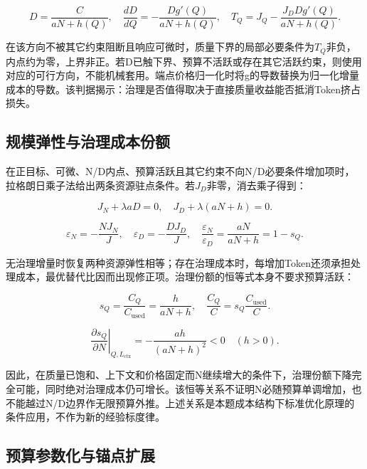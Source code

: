 \documentclass[UTF8,12pt,a4paper]{ctexart}
\begin{document}
\begin{equation}\label{eq:q3_12}
D=\frac{C}{aN+h(Q)},\quad\frac{dD}{dQ}=-\frac{Dg'(Q)}{aN+h(Q)},\quad T_Q=J_Q-\frac{J_DDg'(Q)}{aN+h(Q)}.
\end{equation}

在该方向不被其它约束阻断且响应可微时，质量下界的局部必要条件为$T_Q$非负，内点约为零，上界非正。若D已触下界、预算不活跃或存在其它活跃约束，则使用对应的可行方向，不能机械套用。端点价格归一化时将g的导数替换为归一化增量成本的导数。该判据揭示：治理是否值得取决于直接质量收益能否抵消Token挤占损失。


\subsection{规模弹性与治理成本份额}

在正目标、可微、N/D内点、预算活跃且其它约束不向N/D必要条件增加项时，拉格朗日乘子法给出两条资源驻点条件。若$J_D$非零，消去乘子得到：


\begin{equation}\label{eq:q3_13}
J_N+\lambda aD=0,\quad J_D+\lambda(aN+h)=0.
\end{equation}

\begin{equation}\label{eq:q3_14}
\varepsilon_N=-\frac{NJ_N}{J},\quad\varepsilon_D=-\frac{DJ_D}{J},\quad\frac{\varepsilon_N}{\varepsilon_D}=\frac{aN}{aN+h}=1-s_Q.
\end{equation}

无治理增量时恢复两种资源弹性相等；存在治理成本时，每增加Token还须承担处理成本，最优替代比因而出现修正项。治理份额的恒等式本身不要求预算活跃：


\begin{equation}\label{eq:q3_15}
s_Q=\frac{C_Q}{C_{\mathrm{used}}}=\frac{h}{aN+h},\quad\frac{C_Q}{C}=s_Q\frac{C_{\mathrm{used}}}{C}.
\end{equation}

\begin{equation}\label{eq:q3_16}
\left.\frac{\partial s_Q}{\partial N}\right|_{Q,L_{\mathrm{ctx}}}=-\frac{ah}{(aN+h)^2}<0\quad(h>0).
\end{equation}

因此，在质量已饱和、上下文和价格固定而N继续增大的条件下，治理份额下降完全可能，同时绝对治理成本仍可增长。该恒等关系不证明N必随预算单调增加，也不能越过N/D边界作无限预算外推。上述关系是本题成本结构下标准优化原理的条件应用，不作为新的经验标度律。


\subsection{预算参数化与锚点扩展}
\end{document}
